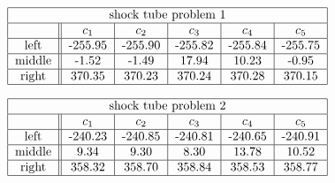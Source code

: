 \documentclass[a4paper,12pt]{article}
\begin{document}
\begin{displaymath}
\begin{tabular}{|c||c|c|c|c|c|}
\hline
\multicolumn{6}{|c|}{shock tube problem 1 }\\
\hline 
     &$ c_1$&$c_2$&$c_3$&$c_4$&$c_5$\\ 
 \hline  
left&-255.95 & -255.90 & -255.82 &-255.84  &-255.75\\ 
 \hline
middle& -1.52&-1.49&17.94&10.23&-0.95\\
 \hline
 right&370.35&370.23& 370.24& 370.28&370.15\\
 \hline
 \end{tabular} 
\end{displaymath}

\begin{displaymath}
\begin{tabular}{|c||c|c|c|c|c|}
\hline
\multicolumn{6}{|c|}{shock tube problem 2}\\
\hline 
     &$ c_1$&$c_2$&$c_3$&$c_4$&$c_5$\\   
 \hline
left& -240.23 & -240.85 & -240.81 &-240.65  &-240.91\\
 \hline
middle& 9.34&9.30&8.30&13.78&10.52\\
 \hline
 right&358.32&358.70& 358.84& 358.53&358.77\\
 \hline

 \end{tabular} 
\end{displaymath}
\end{document}
